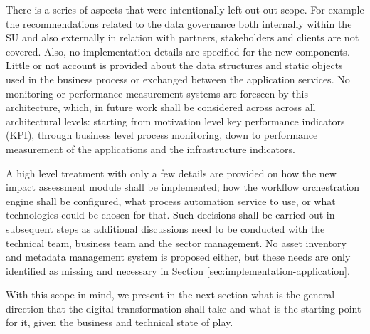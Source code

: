 	There is a series of aspects that were intentionally left out out scope. For example the recommendations related to the data governance both internally within the SU and also externally in relation with partners, stakeholders and clients are not covered. Also, no implementation details are specified for the new components. Little or not account is provided about the data structures and static objects used in the business process or exchanged between the application services. No monitoring or performance measurement systems are foreseen by this architecture, which, in future work shall be considered across across all architectural levels: starting from motivation level key performance indicators (KPI), through business level process monitoring, down to performance measurement of the applications and the infrastructure indicators. 
	
	A high level treatment with only a few details are provided on how the new impact assessment module shall be implemented; how the workflow orchestration engine shall be configured, what process automation service to use, or what technologies could be chosen for that. Such decisions shall be carried out in subsequent steps as additional discussions need to be conducted with the technical team, business team and the sector management. No asset inventory and metadata management system is proposed either, but these needs are only identified as missing and necessary in Section \ref{sec:implementation-application}.
	
	With this scope in mind, we present in the next section what is the general direction that the digital transformation shall take and what is the starting point for it, given the business and technical state of play. 